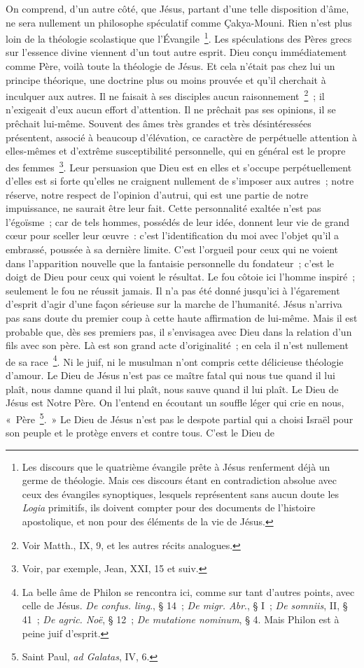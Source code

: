\documentclass[french,twoside]{book} %
\begin{document}
On comprend, d’un autre côté, que Jésus, partant d’une telle disposition d’âme, ne sera nullement un philosophe spéculatif comme Çakya-Mouni. Rien n’est plus loin de la théologie scolastique que l’Évangile \footnote{ Les discours que le quatrième évangile prête à Jésus renferment déjà un germe de théologie. Mais ces discours étant en contradiction absolue avec ceux des évangiles synoptiques, lesquels représentent sans aucun doute les {\itshape Logia} primitifs, ils doivent compter pour des documents de l’histoire apostolique, et non pour des éléments de la vie de Jésus.}. Les spéculations des Pères grecs sur l’essence divine viennent d’un tout autre esprit. Dieu conçu immédiatement comme Père, voilà toute la théologie de Jésus. Et cela n’était pas chez lui un principe théorique, une doctrine plus ou moins prouvée et qu’il cherchait à inculquer aux autres. Il ne faisait à ses disciples aucun raisonnement \footnote{Voir Matth., IX, 9, et les autres récits analogues.} ; il n’exigeait d’eux aucun effort d’attention. Il ne prêchait pas ses opinions, il se prêchait lui-même. Souvent des âmes très grandes et très désintéressées présentent, associé à beaucoup d’élévation, ce caractère de perpétuelle attention à elles-mêmes et d’extrême susceptibilité personnelle, qui en général est le propre des femmes \footnote{Voir, par exemple, Jean, XXI, 15 et suiv.}. Leur persuasion que Dieu est en elles et s’occupe perpétuellement d’elles est si forte qu’elles ne craignent nullement de s’imposer aux autres ; notre réserve, notre respect de l’opinion d’autrui, qui est une partie de notre impuissance, ne saurait être leur fait. Cette personnalité exaltée n’est pas l’égoïsme ; car de tels hommes, possédés de leur idée, donnent leur vie de grand cœur pour sceller leur œuvre : c’est l’identification du moi avec l’objet qu’il a embrassé, poussée à sa dernière limite. C’est l’orgueil pour ceux qui ne voient dans l’apparition nouvelle que la fantaisie personnelle du fondateur ; c’est le doigt de Dieu pour ceux qui voient le résultat. Le fou côtoie ici l’homme inspiré ; seulement le fou ne réussit jamais. Il n’a pas été donné jusqu’ici à l’égarement d’esprit d’agir d’une façon sérieuse sur la marche de l’humanité. Jésus n’arriva pas sans doute du premier coup à cette haute affirmation de lui-même. Mais il est probable que, dès ses premiers pas, il s’envisagea avec Dieu dans la relation d’un fils avec son père. Là est son grand acte d’originalité ; en cela il n’est nullement de sa race \footnote{ La belle âme de Philon se rencontra ici, comme sur tant d’autres points, avec celle de Jésus. {\itshape De confus. ling}., § 14 ; {\itshape De migr. Abr}., § I ; {\itshape De somniis}, II, § 41 ; {\itshape De agric. Noë}, § 12 ; {\itshape De mutatione nominum}, § 4. Mais Philon est à peine juif d’esprit.}. Ni le juif, ni le musulman n’ont compris cette délicieuse théologie d’amour. Le Dieu de Jésus n’est pas ce maître fatal qui nous tue quand il lui plaît, nous damne quand il lui plaît, nous sauve quand il lui plaît. Le Dieu de Jésus est Notre Père. On l’entend en écoutant un souffle léger qui crie en nous, « Père \footnote{ Saint Paul, {\itshape ad Galatas}, IV, 6.}. » Le Dieu de Jésus n’est pas le despote partial qui a choisi Israël pour son peuple et le protège envers et contre tous. C’est le Dieu de 
\end{document}
